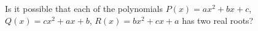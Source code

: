 Is it possible that each of the polynomials $P(x) = ax^2 + bx + c$, $Q(x) = cx^2 + ax + b$, $R(x) = bx^2 + cx + a$ has two real roots?
